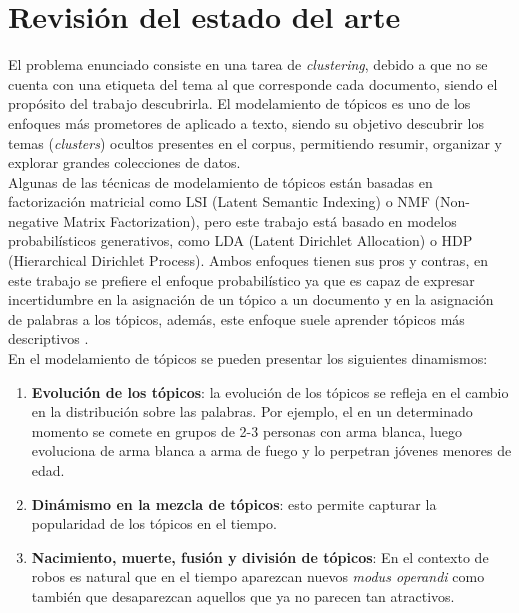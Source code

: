 \section{Revisión del estado del arte}

El problema enunciado consiste en una tarea de \textit{clustering}, debido a que no se cuenta con una etiqueta del tema al que corresponde cada documento, siendo el propósito del trabajo descubrirla. El modelamiento de tópicos es uno de los enfoques más prometores de  aplicado a texto, siendo su objetivo descubrir los temas (\textit{clusters}) ocultos presentes en el corpus, permitiendo resumir, organizar y explorar grandes colecciones de datos.\\

Algunas de las técnicas de modelamiento de tópicos están basadas en factorización matricial como LSI (Latent Semantic Indexing) \citep{dumais2004latent} o NMF (Non-negative Matrix Factorization)\citep{xu2003document}, pero este trabajo está basado en modelos probabilísticos generativos, como LDA (Latent Dirichlet Allocation)\citep{blei2003latent} o HDP (Hierarchical Dirichlet Process)\citep{teh2005sharing}. Ambos enfoques tienen sus pros y contras, en este trabajo se prefiere el enfoque probabilístico ya que es capaz de expresar incertidumbre en la asignación de un tópico a un documento y en la asignación de palabras a los tópicos, además, este enfoque suele aprender tópicos más descriptivos \citep{stevens2012exploring}.\\

En el modelamiento de tópicos se pueden presentar los siguientes dinamismos:
\begin{enumerate}
    \item \textbf{Evolución de los tópicos}: la evolución de los tópicos se refleja en el cambio en la distribución sobre las palabras. Por ejemplo, el  en un determinado momento se comete en grupos de 2-3 personas con arma blanca, luego evoluciona de arma blanca a arma de fuego y lo perpetran jóvenes menores de edad.
    \item \textbf{Dinámismo en la mezcla de tópicos}: esto permite capturar la popularidad de los tópicos en el tiempo.
    \item \textbf{Nacimiento, muerte, fusión y división de tópicos}: En el contexto de robos es natural que en el tiempo aparezcan nuevos \textit{modus operandi} como también que desaparezcan aquellos que ya no parecen tan atractivos.
\end{enumerate}

